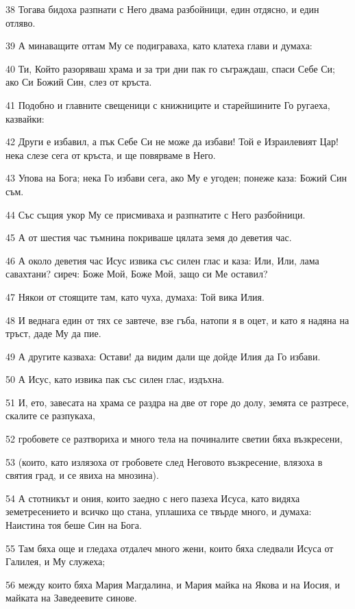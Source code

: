 \par 38 Тогава бидоха разпнати с Него двама разбойници, един отдясно, и един отляво.
\par 39 А минаващите оттам Му се подиграваха, като клатеха глави и думаха:
\par 40 Ти, Който разоряваш храма и за три дни пак го съграждаш, спаси Себе Си; ако Си Божий Син, слез от кръста.
\par 41 Подобно и главните свещеници с книжниците и старейшините Го ругаеха, казвайки:
\par 42 Други е избавил, а пък Себе Си не може да избави! Той е Израилевият Цар! нека слезе сега от кръста, и ще повярваме в Него.
\par 43 Упова на Бога; нека Го избави сега, ако Му е угоден; понеже каза: Божий Син съм.
\par 44 Със същия укор Му се присмиваха и разпнатите с Него разбойници.
\par 45 А от шестия час тъмнина покриваше цялата земя до деветия час.
\par 46 А около деветия час Исус извика със силен глас и каза: Или, Или, лама савахтани? сиреч: Боже Мой, Боже Мой, защо си Ме оставил?
\par 47 Някои от стоящите там, като чуха, думаха: Той вика Илия.
\par 48 И веднага един от тях се завтече, взе гъба, натопи я в оцет, и като я надяна на тръст, даде Му да пие.
\par 49 А другите казваха: Остави! да видим дали ще дойде Илия да Го избави.
\par 50 А Исус, като извика пак със силен глас, издъхна.
\par 51 И, ето, завесата на храма се раздра на две от горе до долу, земята се разтресе, скалите се разпукаха,
\par 52 гробовете се разтвориха и много тела на починалите светии бяха възкресени,
\par 53 (които, като излязоха от гробовете след Неговото възкресение, влязоха в святия град, и се явиха на мнозина).
\par 54 А стотникът и ония, които заедно с него пазеха Исуса, като видяха земетресението и всичко що стана, уплашиха се твърде много, и думаха: Наистина тоя беше Син на Бога.
\par 55 Там бяха още и гледаха отдалеч много жени, които бяха следвали Исуса от Галилея, и Му служеха;
\par 56 между които бяха Мария Магдалина, и Мария майка на Якова и на Иосия, и майката на Заведеевите синове.
